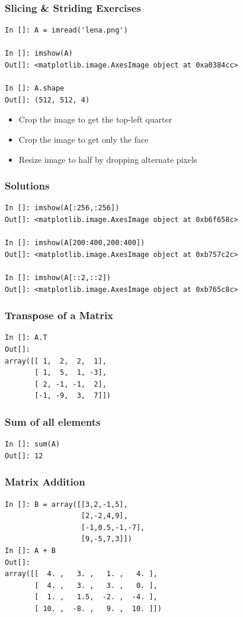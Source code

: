 \documentclass[14pt,compress]{beamer}
\begin{document}
\begin{frame}[fragile]
  \frametitle{Slicing \& Striding Exercises}
\begin{small}
  \begin{lstlisting}
In []: A = imread('lena.png')

In []: imshow(A)
Out[]: <matplotlib.image.AxesImage object at 0xa0384cc>

In []: A.shape 
Out[]: (512, 512, 4)
  \end{lstlisting}
\end{small}
  \begin{itemize}
  \item Crop the image to get the top-left quarter
  \item Crop the image to get only the face
  \item Resize image to half by dropping alternate pixels
  \end{itemize}
\end{frame}

\begin{frame}[fragile]
  \frametitle{Solutions}
\begin{small}
  \begin{lstlisting}
In []: imshow(A[:256,:256])
Out[]: <matplotlib.image.AxesImage object at 0xb6f658c>

In []: imshow(A[200:400,200:400])
Out[]: <matplotlib.image.AxesImage object at 0xb757c2c>

In []: imshow(A[::2,::2])
Out[]: <matplotlib.image.AxesImage object at 0xb765c8c>
  \end{lstlisting}
\end{small}
\end{frame}

\begin{frame}[fragile]
\frametitle{Transpose of a Matrix}
\begin{lstlisting}
In []: A.T
Out[]:
array([[ 1,  2,  2,  1],
       [ 1,  5,  1, -3],
       [ 2, -1, -1,  2],
       [-1, -9,  3,  7]])
\end{lstlisting}
\end{frame}

\begin{frame}[fragile]
  \frametitle{Sum of all elements}
  \begin{lstlisting}
In []: sum(A)
Out[]: 12
  \end{lstlisting}
\end{frame}

\begin{frame}[fragile]
  \frametitle{Matrix Addition}
  \begin{lstlisting}
In []: B = array([[3,2,-1,5],
                  [2,-2,4,9],
                  [-1,0.5,-1,-7],
                  [9,-5,7,3]])
In []: A + B
Out[]: 
array([[  4. ,   3. ,   1. ,   4. ],
       [  4. ,   3. ,   3. ,   0. ],
       [  1. ,   1.5,  -2. ,  -4. ],
       [ 10. ,  -8. ,   9. ,  10. ]])
  \end{lstlisting}
\end{frame}
\end{document}
